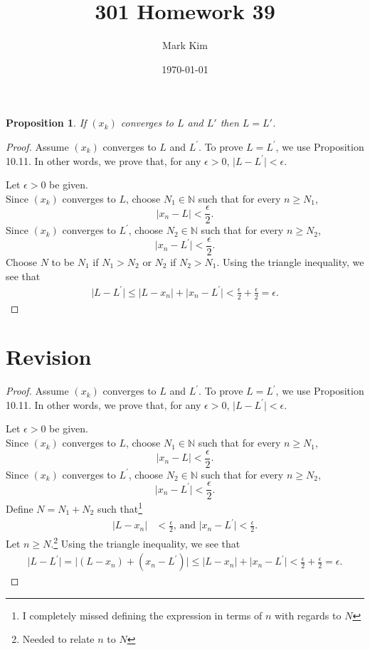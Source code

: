 \documentclass[12pt]{amsart}
\title{301 Homework 39}
\author{Mark Kim}
\date{\today}
\newcommand{\N}{\mathbb{N}}
\newtheorem*{proposition}{Proposition}
\begin{document}
\maketitle

\begin{proposition}
If $(x_k)$ converges to $L$ and $L\prime$ then $L=L\prime$.
\end{proposition}

\begin{proof}
Assume $(x_k)$ converges to $L$ and $L^\prime$.  To prove $L = L^\prime$, we use Proposition 10.11.  In other words, we prove that, for any $\epsilon > 0$, $\lvert L - L^\prime\rvert < \epsilon$.

Let $\epsilon > 0$ be given.\\
Since $(x_k)$ converges to $L$, choose $N_1\in\N$ such that for every $n\geq N_1$, \[\lvert x_n-L\rvert < \frac{\epsilon}{2}.\]
Since $(x_k)$ converges to $L^\prime$, choose $N_2\in\N$ such that for every $n\geq N_2$, \[\lvert x_n-L^\prime\rvert < \frac{\epsilon}{2}.\]
Choose $N$ to be $N_1$ if $N_1 > N_2$ or $N_2$ if $N_2>N_1$.  Using the triangle inequality, we see that
\begin{align*}
\lvert L-L^\prime\rvert \leq \lvert L-x_n\rvert + \lvert x_n -L^\prime\rvert < \frac{\epsilon}{2} + \frac{\epsilon}{2} = \epsilon.
\end{align*}
\end{proof}

\section*{Revision}

\begin{proof}
Assume $(x_k)$ converges to $L$ and $L^\prime$.  To prove $L = L^\prime$, we use Proposition 10.11.  In other words, we prove that, for any $\epsilon > 0$, $\lvert L - L^\prime\rvert < \epsilon$.

Let $\epsilon > 0$ be given.\\
Since $(x_k)$ converges to $L$, choose $N_1\in\N$ such that for every $n\geq N_1$, \[\lvert x_n-L\rvert < \frac{\epsilon}{2}.\]
Since $(x_k)$ converges to $L^\prime$, choose $N_2\in\N$ such that for every $n\geq N_2$, \[\lvert x_n-L^\prime\rvert < \frac{\epsilon}{2}.\]
Define $N=N_1+N_2$ such that\footnote{I completely missed defining the expression in terms of $n$ with regards to $N$}
\begin{align*}
\lvert L - x_n\rvert &< \frac{\epsilon}{2}\text{, and }\lvert x_n-L^\prime\rvert < \frac{\epsilon}{2}.
\end{align*}
Let $n\geq N$.\footnote{Needed to relate $n$ to $N$}  Using the triangle inequality, we see that
\begin{align*}
\lvert L-L^\prime\rvert = \lvert (L - x_n) + (x_n-L^\prime)\rvert \leq \lvert L - x_n \rvert + \lvert x_n-L^\prime\rvert < \frac{\epsilon}{2} + \frac{\epsilon}{2} = \epsilon.
\end{align*}
\end{proof}
\end{document}
